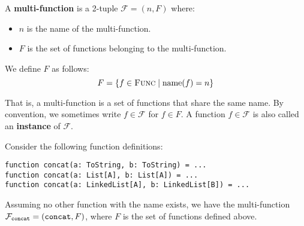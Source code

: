 \noindent A \textbf{multi-function} is a 2-tuple $\mathcal{F} = (n, F)$ where:
\begin{itemize}
	\item $n$ is the name of the multi-function.
	\item $F$ is the set of functions belonging to the multi-function.
\end{itemize}

\noindent We define $F$ as follows:
\begin{equation*}
	F = \{ f \in \textsc{Func} \mid \operatorname{name}(f) = n \}
\end{equation*}

\noindent That is, a multi-function is a set of functions that share the same name. By convention, we sometimes write $f \in \mathcal{F}$ for $f \in F$. A function $f \in \mathcal{F}$ is also called an \textbf{instance} of $\mathcal{F}$.

\begin{example}
	Consider the following function definitions:
	\begin{lstlisting}
function concat(a: ToString, b: ToString) = ...
function concat(a: List[A], b: List[A]) = ...
function concat(a: LinkedList[A], b: LinkedList[B]) = ...
	\end{lstlisting}
	
	\noindent Assuming no other function with the name  exists, we have the multi-function $\mathcal{F}_{\text{\texttt{concat}}} = (\text{\texttt{concat}}, F)$, where $F$ is the set of  functions defined above.
\end{example}









